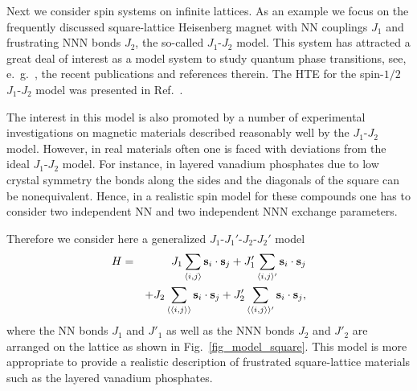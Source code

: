 \documentclass[aps,twocolumn,groupedaddress]{revtex4}
\begin{document}
Next we consider spin systems  on infinite lattices.
As an example we focus on the frequently discussed square-lattice Heisenberg
magnet with NN couplings $J_1$ and frustrating NNN bonds
$J_2$, the so-called $J_1$-$J_2$ model. This system has
attracted a great deal of interest as a model system to
study quantum phase transitions, see, e.~g.~, the recent publications
and references therein. The HTE for the spin-$1/2$
$J_1$-$J_2$ model was presented in Ref.~.

The interest in this model is also promoted by a number of experimental
investigations on magnetic materials described reasonably well by
the  $J_1$-$J_2$ model.   However, in real materials often one is faced with
deviations from the ideal $J_1$-$J_2$ model. For instance,
in layered vanadium phosphates \cite{rosner2009,rosner2010}
due to low crystal symmetry the bonds along the sides
and the diagonals  of the square can be nonequivalent. Hence,
in a realistic spin
model for these compounds one has to consider two independent NN and two independent NNN
exchange parameters.

Therefore we consider here a generalized  $J_1$-$J_1'$-$J_2$-$J_2'$ model
\begin{eqnarray} \label{model_square}
H&=&J_1\sum_{\langle i,j\rangle} {\bf s}_i \cdot {\bf s}_{j}+
J'_1 \sum_{\langle i,j\rangle'} {\bf s}_i \cdot {\bf s}_{j}
\nonumber \\
&& + J_2\sum_{\langle \langle i,j\rangle\rangle}   {\bf s}_i \cdot {\bf s}_{j}
+ J'_2\sum_{\langle \langle i,j\rangle\rangle'}   {\bf s}_i \cdot {\bf
s}_{j},
\end{eqnarray}
where the NN bonds $J_1$ and $J'_1$ as well as the NNN bonds $J_2$ and
$J'_2$ are arranged on the lattice as shown in Fig.~\ref{fig_model_square}.
This model is more appropriate to provide a realistic description  of frustrated
square-lattice materials such as the layered vanadium phosphates.
\end{document}
